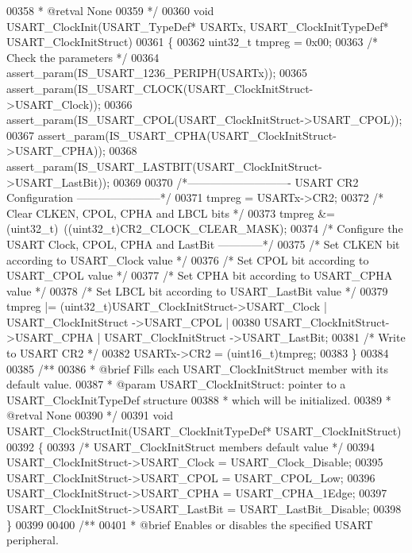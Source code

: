 \begin{DoxyCode}
00358 \textcolor{comment}{  * @retval None}
00359 \textcolor{comment}{  */}
00360 \textcolor{keywordtype}{void} USART_ClockInit(USART\_TypeDef* USARTx, USART\_ClockInitTypeDef* USART\_ClockInitStruct)
00361 \{
00362   uint32\_t tmpreg = 0x00;
00363   \textcolor{comment}{/* Check the parameters */}
00364   assert_param(IS\_USART\_1236\_PERIPH(USARTx));
00365   assert_param(IS\_USART\_CLOCK(USART\_ClockInitStruct->USART\_Clock));
00366   assert_param(IS\_USART\_CPOL(USART\_ClockInitStruct->USART\_CPOL));
00367   assert_param(IS\_USART\_CPHA(USART\_ClockInitStruct->USART\_CPHA));
00368   assert_param(IS\_USART\_LASTBIT(USART\_ClockInitStruct->USART\_LastBit));
00369 
00370 \textcolor{comment}{/*---------------------------- USART CR2 Configuration -----------------------*/}
00371   tmpreg = USARTx->CR2;
00372   \textcolor{comment}{/* Clear CLKEN, CPOL, CPHA and LBCL bits */}
00373   tmpreg &= (uint32\_t)~((uint32\_t)CR2_CLOCK_CLEAR_MASK);
00374   \textcolor{comment}{/* Configure the USART Clock, CPOL, CPHA and LastBit ------------*/}
00375   \textcolor{comment}{/* Set CLKEN bit according to USART\_Clock value */}
00376   \textcolor{comment}{/* Set CPOL bit according to USART\_CPOL value */}
00377   \textcolor{comment}{/* Set CPHA bit according to USART\_CPHA value */}
00378   \textcolor{comment}{/* Set LBCL bit according to USART\_LastBit value */}
00379   tmpreg |= (uint32\_t)USART\_ClockInitStruct->USART_Clock | USART\_ClockInitStruct
      ->USART_CPOL |
00380                  USART\_ClockInitStruct->USART_CPHA | USART\_ClockInitStruct
      ->USART_LastBit;
00381   \textcolor{comment}{/* Write to USART CR2 */}
00382   USARTx->CR2 = (uint16\_t)tmpreg;
00383 \}
00384 
00385 \textcolor{comment}{/**}
00386 \textcolor{comment}{  * @brief  Fills each USART\_ClockInitStruct member with its default value.}
00387 \textcolor{comment}{  * @param  USART\_ClockInitStruct: pointer to a USART\_ClockInitTypeDef structure}
00388 \textcolor{comment}{  *         which will be initialized.}
00389 \textcolor{comment}{  * @retval None}
00390 \textcolor{comment}{  */}
00391 \textcolor{keywordtype}{void} USART_ClockStructInit(USART\_ClockInitTypeDef* USART\_ClockInitStruct)
00392 \{
00393   \textcolor{comment}{/* USART\_ClockInitStruct members default value */}
00394   USART\_ClockInitStruct->USART_Clock = USART_Clock_Disable;
00395   USART\_ClockInitStruct->USART_CPOL = USART_CPOL_Low;
00396   USART\_ClockInitStruct->USART_CPHA = USART_CPHA_1Edge;
00397   USART\_ClockInitStruct->USART_LastBit = USART_LastBit_Disable;
00398 \}
00399 
00400 \textcolor{comment}{/**}
00401 \textcolor{comment}{  * @brief  Enables or disables the specified USART peripheral.}

\end{DoxyCode}

